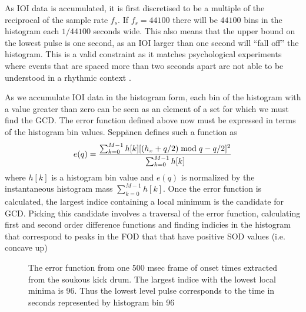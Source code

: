 As IOI data is accumulated, it is first discretised to be a multiple of
the reciprocal of the sample rate $f_{s}$.  If $f_{s} = 44100$ there will
be $44100$ bins in the histogram each $1/44100$ seconds wide. This also means
that the upper bound on the lowest pulse is one second, as an IOI larger than
one second will ``fall off'' the histogram. This is a valid constraint as it
matches psychological experiments where events that are spaced more than 
two seconds apart are not able to be understood in a rhythmic context \cite{Warren:93}.

As we accumulate IOI data in the histogram form, each bin of the histogram
with a value greater than zero can be seen as an element of a set for which
we must find the GCD.  The error function defined above now must be expressed
in terms of the histogram bin values. Sepp\"anen defines such a function
as $$e(q) ={ \sum_{k=0}^{M-1}h[k][(h_{x} + q/2)\bmod q - q/2]^2 \over
  \sum_{k=0}^{M-1}h[k]}$$ where $h[k]$ is a histogram bin value and
$e(q)$ is normalized by the instantaneous histogram mass $\sum_{k=0}^{M-1}h[k]$. Once the error function is calculated,
the largest indice containing a local minimum is the candidate for
GCD.  Picking this candidate involves a traversal of the error
function, calculating first and second order difference functions and 
finding indicies in the histogram that correspond to peaks in the FOD 
that that have positive SOD values (i.e. concave up) 


\begin{figure}[thp]
  \begin{center}
    \caption{The error function from one 500 msec frame of onset
      times extracted from the soukous kick drum. The largest indice
      with the lowest local minima is 96. Thus the lowest level pulse
      corresponds to the time in seconds represented by histogram bin 96} 
    \label{The GCD Error Function $e(q)$}
 \end{center}
\end{figure}


